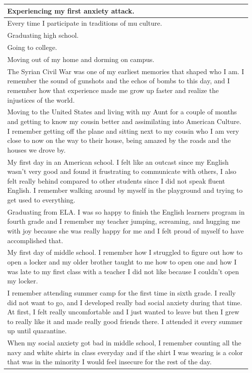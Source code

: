 \documentclass[
  .7em,
  letterpaper,
  DIV=11,
  numbers=noendperiod]{scrartcl}
\begin{document}
\begin{table}
\begin{tabular}{l}
\hline
Experiencing my first anxiety attack.\\
\hline
Every time I participate in traditions of mu culture.\\
\hline
Graduating high school.\\
\hline
Going to college.\\
\hline
Moving out of my home and dorming on campus.\\
\hline
The Syrian Civil War was one of my earliest memories that shaped who I am. I remember the sound of gunshots and the echos of bombs to this day, and I remember how that experience made me grow up faster and realize the injustices of the world.\\
\hline
Moving to the United States and living with my Aunt for a couple of months and getting to know my cousin better and assimilating into American Culture. I remember getting off the plane and sitting next to my cousin who I am very close to now on the way to their house, being amazed by the roads and the houses we drove by.\\
\hline
My first day in an American school. I felt like an outcast since my English wasn't very good and found it frustrating to communicate with others, I also felt really behind compared to other students since I did not speak fluent English. I remember walking around by myself in the playground and trying to get used to everything.\\
\hline
Graduating from ELA. I was so happy to finish the English learners program in fourth grade and I remember my teacher jumping, screaming, and hugging me with joy because she was really happy for me and I felt proud of myself to have accomplished that.\\
\hline
My first day of middle school. I remember how I struggled to figure out how to open a locker and my older brother taught to me how to open one and how I was late to my first class with a teacher I did not like because I couldn't open my locker.\\
\hline
I remember attending summer camp for the first time in sixth grade. I really did not want to go, and I developed really bad social anxiety during that time. At first, I felt really uncomfortable and I just wanted to leave but then I grew to really like it and made really good friends there. I attended it every summer up until quarantine.\\
\hline
When my social anxiety got bad in middle school, I remember counting all the navy and white shirts in class everyday and if the shirt I was wearing is a color that was in the minority I would feel insecure for the rest of the day.\\

\end{tabular}
\end{table}
\end{document}
